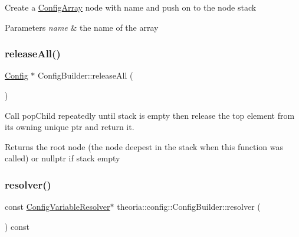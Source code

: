 Create a \hyperlink{classtheoria_1_1config_1_1ConfigArray}{Config\+Array} node with name and push on to the node stack 
\begin{DoxyParams}{Parameters}
{\em name} & the name of the array \\
\hline
\end{DoxyParams}
\mbox{\label{classtheoria_1_1config_1_1ConfigBuilder_a06911a804a22e89101dab7ca3a08b049}} 
\subsubsection{\texorpdfstring{release\+All()}{releaseAll()}}
{\footnotesize\ttfamily \hyperlink{classtheoria_1_1config_1_1Config}{Config} $\ast$ Config\+Builder\+::release\+All (\begin{DoxyParamCaption}{ }\end{DoxyParamCaption})}

Call pop\+Child repeatedly until stack is empty then release the top element from its owning unique ptr and return it. \begin{DoxyReturn}{Returns}
the root node (the node deepest in the stack when this function was called) or nullptr if stack empty 
\end{DoxyReturn}
\mbox{\label{classtheoria_1_1config_1_1ConfigBuilder_aa40d918441c9cbc0b60bdcd39551164f}} 
\subsubsection{\texorpdfstring{resolver()}{resolver()}}
{\footnotesize\ttfamily const \hyperlink{classtheoria_1_1config_1_1ConfigVariableResolver}{Config\+Variable\+Resolver}$\ast$ theoria\+::config\+::\+Config\+Builder\+::resolver (\begin{DoxyParamCaption}{ }\end{DoxyParamCaption}) const\hspace{0.3cm}{\ttfamily [inline]}}

